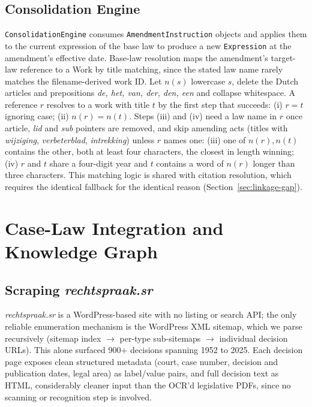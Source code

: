 \documentclass{IOS-Book-Article}
\begin{document}
\subsection{Consolidation Engine}

\texttt{ConsolidationEngine} consumes \texttt{AmendmentInstruction} objects and applies them to the current
expression of the base law to produce a new \texttt{Expression} at the amendment's effective date.
Base-law resolution maps the amendment's target-law reference to a Work by title matching,
since the stated law name rarely matches the filename-derived work ID.
Let $n(s)$ lowercase $s$, delete the Dutch articles and prepositions \emph{de, het, van,
der, den, een} and collapse whitespace. A reference $r$ resolves to a work with title $t$ by
the first step that succeeds: (i) $r = t$ ignoring case; (ii) $n(r) = n(t)$. Steps (iii) and
(iv) need a law name in $r$ once article, \emph{lid} and \emph{sub} pointers are removed, and
skip amending acts (titles with \emph{wijziging}, \emph{verbeterblad}, \emph{intrekking})
unless $r$ names one: (iii) one of $n(r), n(t)$ contains the other, both at least four
characters, the closest in length winning; (iv) $r$ and $t$ share a four-digit year and $t$
contains a word of $n(r)$ longer than three characters. This
matching logic is shared with citation resolution, which requires the identical fallback for
the identical reason (Section~\ref{sec:linkage-gap}).

\section{Case-Law Integration and Knowledge Graph}
\label{sec:caselaw}

\subsection{Scraping \emph{rechtspraak.sr}}
\label{sec:caselaw-scraping}

\emph{rechtspraak.sr} is a WordPress-based site with no listing or search API; the only reliable
enumeration mechanism is the WordPress XML sitemap, which we parse recursively (sitemap
index $\rightarrow$ per-type sub-sitemaps $\rightarrow$ individual decision URLs). This alone surfaced 900+
decisions spanning 1952 to 2025. Each decision page exposes clean structured metadata (court,
case number, decision and publication dates, legal area) as label/value pairs, and full
decision text as HTML, considerably cleaner input than the OCR'd legislative PDFs, since
no scanning or recognition step is involved.
\end{document}
